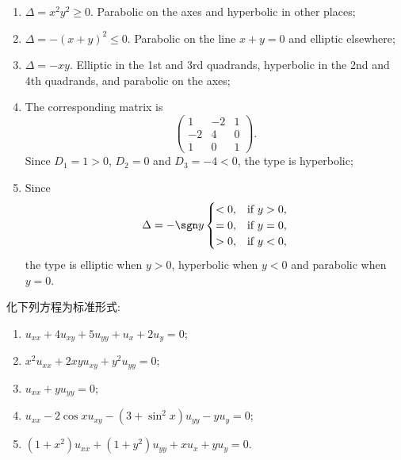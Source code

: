 \begin{solution}
  \begin{enumerate}[(1)]
    \item $\Delta = x^2y^2\geq 0$. Parabolic on the axes and hyperbolic in other places;
    \item $\Delta = -(x+y)^2\leq 0$. Parabolic on the line $x+y=0$ and elliptic elsewhere;
    \item $\Delta = -xy$. Elliptic in the 1st and 3rd quadrands, hyperbolic in the 2nd and 4th
      quadrands, and parabolic on the axes;
    \item The corresponding matrix is
      \[\begin{pmatrix}
        1 & -2 & 1 \\
        -2 & 4 & 0 \\
        1 & 0 & 1
      \end{pmatrix}.\]
      Since $D_1=1>0$, $D_2=0$ and $D_3=-4<0$, the type is hyperbolic;
    \item Since
      \[\Delta = -\sgn y \begin{cases}
        <0, & \text{if}\ y>0, \\
        =0, & \text{if}\ y=0, \\
        >0, & \text{if}\ y<0,
      \end{cases}\]
      the type is elliptic when $y>0$, hyperbolic when $y<0$ and parabolic when $y=0$.
  \end{enumerate}
\end{solution}


\begin{exercise}[3]
  化下列方程为标准形式:
  \begin{enumerate}[(1)]
    \item $u_{xx} + 4u_{xy} + 5u_{yy} + u_x + 2u_y = 0$;
    \item $x^2 u_{xx} + 2xy u_{xy} + y^2 u_{yy} = 0$;
    \item $u_{xx} + yu_{yy} = 0$;
    \item $u_{xx} - 2\cos x u_{xy} - (3 + \sin^2 x)u_{yy} - yu_y = 0$;
    \item $(1+x^2)u_{xx} + (1+y^2)u_{yy} + xu_x + yu_y = 0$.
  \end{enumerate}
\end{exercise}

